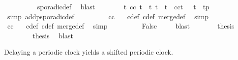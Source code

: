 \begin{isabellebody}
\ \ \ \ \ \ \ \ \isamarkupfalse%
\ sporadic{\isacharunderscore}def\ \isamarkupfalse%
\ blast\isanewline
\ \ \ \ \ \ \isamarkupfalse%
\ {\isacartoucheopen}{\isasymforall}t{\isachardot}\ {\isacharparenleft}c{\isasymoplus}c{\isacharprime}{\isacharparenright}\ t\ {\isasymlongrightarrow}\ {\isacharparenleft}{\isasymforall}t{\isacharprime}{\isachardot}\ {\isacharparenleft}t\ {\isacharless}\ t{\isacharprime}\ {\isasymand}\ {\isacharparenleft}c{\isasymoplus}c{\isacharprime}{\isacharparenright}t{\isacharprime}{\isacharparenright}\ {\isasymlongrightarrow}\ \ t{\isacharprime}\ {\isachargreater}\ t{\isacharplus}p{\isacharparenright}{\isacartoucheclose}\isanewline
\ \ \ \ \ \ \ \ \isamarkupfalse%
\ {\isacharparenleft}simp\ add{\isacharcolon}p{\isacharunderscore}sporadic{\isacharunderscore}def{\isacharparenright}\isanewline
\ \ \ \ \ \ \isamarkupfalse%
\ \isamarkupfalse%
\ {\isacartoucheopen}{\isacharparenleft}c{\isasymoplus}c{\isacharprime}{\isacharparenright}\ {}{\isacartoucheclose}\ \isamarkupfalse%
\ c{\isacharunderscore}def\ c{\isacharprime}{\isacharunderscore}def\ merge{\isacharunderscore}def\ \isamarkupfalse%
\ simp\isanewline
\ \ \ \ \ \ \isamarkupfalse%
\ \isamarkupfalse%
\ {\isacartoucheopen}{\isacharparenleft}c{\isasymoplus}c{\isacharprime}{\isacharparenright}\ {}{\isacartoucheclose}\ \isamarkupfalse%
\ c{\isacharunderscore}def\ c{\isacharprime}{\isacharunderscore}def\ merge{\isacharunderscore}def\ \isamarkupfalse%
\ simp\isanewline
\ \ \ \ \ \ \isamarkupfalse%
\ \isamarkupfalse%
\ False\ \isamarkupfalse%
\ {\isacharasterisk}\ \isamarkupfalse%
\ blast\isanewline
\ \ \ \ \isacommand{{\isacharbraceright}}\isamarkupfalse%
\ \isamarkupfalse%
\ {\isacharquery}thesis\ \isacommand{{\isachardot}{\isachardot}}\isamarkupfalse%
\isanewline
\ \ \isamarkupfalse%
\isanewline
\ \ \isamarkupfalse%
\ {}\ \ {}\ \isamarkupfalse%
\ {\isacharquery}thesis\ \isamarkupfalse%
\ blast\isanewline
{}\isamarkupfalse%
%
\endisatagproof
{\isafoldproof}%
%
\isadelimproof
%
\endisadelimproof
%
\begin{isamarkuptext}%
Delaying a periodic clock yields a shifted periodic clock.%
\end{isamarkuptext}\isamarkuptrue%

\end{isabellebody}
